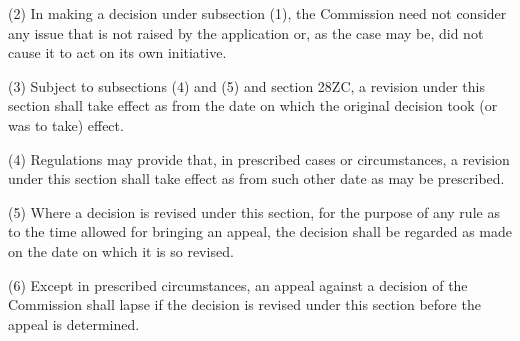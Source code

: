 \documentclass[12pt,a4paper]{article}
\begin{document}
(2) In making a decision under subsection (1), the 
Commission  %
need not consider any issue that is not raised by the application or, as the case may be, did not cause 
it  %
to act on 
its  %
own initiative.

(3) Subject to subsections (4) and (5) and section 28ZC, a revision under this section shall take effect as from the date on which the original decision took (or was to take) effect.

(4) Regulations may provide that, in prescribed cases or circumstances, a revision under this section shall take effect as from such other date as may be prescribed.

(5) Where a decision is revised under this section, for the purpose of any rule as to the time allowed for bringing an appeal, the decision shall be regarded as made on the date on which it is so revised.

(6) Except in prescribed circumstances, an appeal against a decision of the 
Commission  %
shall lapse if the decision is revised under this section before the appeal is determined.

\end{document}
